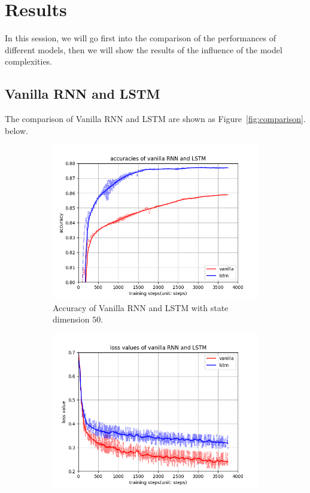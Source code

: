 \documentclass[12pt,letterpaper]{article}
\begin{document}
\section{Results}

In this session, we will go first into the comparison of the performances of different models, then we will show the results of the influence of the model complexities.

\subsection*{Vanilla RNN and LSTM}

The comparison of Vanilla RNN and LSTM are shown as Figure~\ref{fig:comparison}. below.
\begin{figure}[h]
    \begin{subfigure}{0.4\textwidth}
    \includegraphics[width=\linewidth]{compare_acc.png}
    \caption{\small Accuracy of Vanilla RNN and LSTM with state dimension $50$.} \label{fig:a}
    \end{subfigure}\hspace*{\fill}
    \begin{subfigure}{0.4\textwidth}
    \includegraphics[width=\linewidth]{compare_loss.png}

\end{subfigure}
\end{figure}
\end{document}
